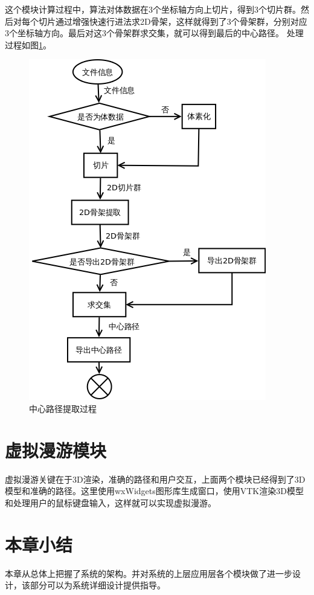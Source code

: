 这个模块计算过程中，算法对体数据在3个坐标轴方向上切片，得到3个切片群。然后对每个切片通过增强快速行进法求2D骨架，这样就得到了3个骨架群，分别对应3个坐标轴方向。最后对这3个骨架群求交集，就可以得到最后的中心路径。
处理过程如图\ref{process_skel_extract}。
\begin{figure}[h!]
    \centering
    \includegraphics[width=300bp]{figure/process_skel_extract.png}
    \caption{中心路径提取过程}
    \label{process_skel_extract}
\end{figure}

\section{虚拟漫游模块}
虚拟漫游关键在于3D渲染，准确的路径和用户交互，上面两个模块已经得到了3D模型和准确的路径。这里使用wxWidgets图形库生成窗口，使用VTK渲染3D模型和处理用户的鼠标键盘输入，这样就可以实现虚拟漫游。

\section{本章小结}
本章从总体上把握了系统的架构。并对系统的上层应用层各个模块做了进一步设计，该部分可以为系统详细设计提供指导。
